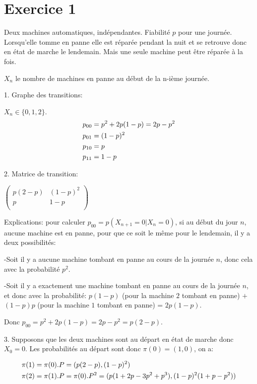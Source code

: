 \documentclass[a4paper,twoside,12pt]{article}
\title{\MYTITLE}
\author{\textsc{Do} Quoc Khanh}
\date{\today}
\begin{document}
\maketitle
\pagestyle{fancy}

\section{Exercice 1}
Deux machines automatiques, indépendantes.
Fiabilité $p$ pour une journée. Lorsqu'elle tomme en panne elle est réparée pendant la nuit et se retrouve donc en état de marche le lendemain. Mais une seule machine peut être réparée à la fois.

$X_n$ le nombre de machines en panne au début de la n-ième journée.

1. Graphe des transitions:

$X_n \in \{0, 1, 2\}$.
\begin{align}
    p_{00} &= p^2 + 2p(1-p) = 2p - p^2 \notag \\
    p_{01} &= (1-p)^2 \notag \\
    p_{10} &= p \notag \\
    p_{11} &= 1-p \notag
\end{align}

2. Matrice de transition:

$ \left( 
\begin{array}{cc}
p(2-p) & (1-p)^2 \\
p & 1-p \\
\end{array} 
\right)$

Explications: pour calculer $p_{00} = p(X_{n+1}=0\vert X_n = 0)$, si au début du jour $n$, aucune machine est en panne, pour que ce soit le même pour le lendemain, il y a deux possibilités:

-Soit il y a aucune machine tombant en panne au cours de la journée $n$, donc cela avec la probabilité $p^2$.

-Soit il y a exactement une machine tombant en panne au cours de la journée $n$, et donc avec la probabilité: $p(1-p)$ (pour la machine $2$ tombant en panne) $+$ $(1-p)p$ (pour la machine $1$ tombant en panne) = $2p(1-p)$.

Donc $p_{00} = p^2 + 2p(1-p) = 2p - p^2 = p(2-p)$.

3. Supposons que les deux machines sont au départ en état de marche donc $X_0 = 0$. Les probabilités au départ sont donc $\pi(0) = (1, 0)$, on a:

\begin{align}
    \pi(1) &= \pi(0).P = (p(2-p), (1-p)^2)\notag \\
    \pi(2) &= \pi(1).P = \pi(0).P^2 = (p(1+2p-3p^2+p^3), (1-p)^2(1+p-p^2)) \notag
\end{align}
\end{document}
